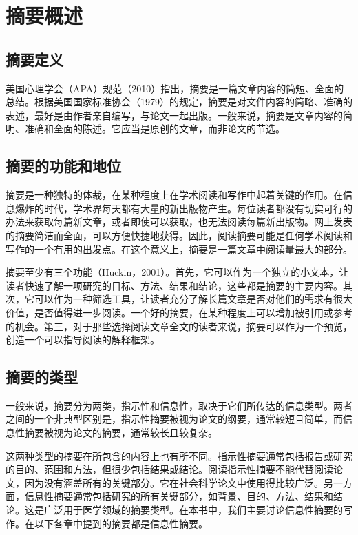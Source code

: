 \documentclass[a4paper]{ctexbook}
\begin{document}
\mainmatter


\chapter{摘要概述}\label{chapter1}
\section{摘要定义}

美国心理学会（APA）规范（2010）指出，摘要是一篇文章内容的简短、全面的总结。根据美国国家标准协会（1979）的规定，摘要是对文件内容的简略、准确的表述，最好是由作者亲自编写，与论文一起出版。一般来说，摘要是文章内容的简明、准确和全面的陈述。它应当是原创的文章，而非论文的节选。

\section{摘要的功能和地位}

摘要是一种独特的体裁，在某种程度上在学术阅读和写作中起着关键的作用。在信息爆炸的时代，学术界每天都有大量的新出版物产生。每位读者都没有切实可行的办法来获取每篇新文章，或者即使可以获取，也无法阅读每篇新出版物。网上发表的摘要简洁而全面，可以方便快捷地获得。因此，阅读摘要可能是任何学术阅读和写作的一个有用的出发点。在这个意义上，摘要是一篇文章中阅读量最大的部分。

摘要至少有三个功能（Huckin，2001）。首先，它可以作为一个独立的小文本，让读者快速了解一项研究的目标、方法、结果和结论，这些都是摘要的主要内容。其次，它可以作为一种筛选工具，让读者充分了解长篇文章是否对他们的需求有很大价值，是否值得进一步阅读。一个好的摘要，在某种程度上可以增加被引用或参考的机会。第三，对于那些选择阅读文章全文的读者来说，摘要可以作为一个预览，创造一个可以指导阅读的解释框架。


\section{摘要的类型}

一般来说，摘要分为两类，指示性和信息性，取决于它们所传达的信息类型。两者之间的一个非典型区别是，指示性摘要被视为论文的纲要，通常较短且简单，而信息性摘要被视为论文的摘要，通常较长且较复杂。

这两种类型的摘要在所包含的内容上也有所不同。指示性摘要通常包括报告或研究的目的、范围和方法，但很少包括结果或结论。阅读指示性摘要不能代替阅读论文，因为没有涵盖所有的关键部分。它在社会科学论文中使用得比较广泛。另一方面，信息性摘要通常包括研究的所有关键部分，如背景、目的、方法、结果和结论。这是广泛用于医学领域的摘要类型。在本书中，我们主要讨论信息性摘要的写作。在以下各章中提到的摘要都是信息性摘要。
\end{document}
